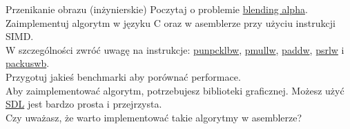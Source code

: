 \begin{exercise}{Przenikanie obrazu (inżynierskie)}{}
Poczytaj o problemie \href{https://en.wikipedia.org/wiki/Alpha_compositing}{blending alpha}. Zaimplementuj algorytm w języku C oraz w asemblerze przy użyciu instrukcji SIMD. \\
W szczególności zwróć uwagę na instrukcje: \href{https://www.felixcloutier.com/x86/punpcklbw:punpcklwd:punpckldq:punpcklqdq}{punpcklbw},
\href{https://www.felixcloutier.com/x86/pmullw}{pmullw}, \href{https://www.felixcloutier.com/x86/paddb:paddw:paddd:paddq}{paddw},
\href{https://www.felixcloutier.com/x86/psrlw:psrld:psrlq}{psrlw} i \href{https://www.felixcloutier.com/x86/packuswb}{packuswb}.\\
Przygotuj jakieś benchmarki aby porównać performace. \\

Aby zaimplementować algorytm, potrzebujesz biblioteki graficznej. Możesz użyć \href{https://www.geeksforgeeks.org/sdl-library-in-c-c-with-examples/}{SDL} jest bardzo prosta i przejrzysta. \\

Czy uważasz, że warto implementować takie algorytmy w asemblerze?
\end{exercise}

